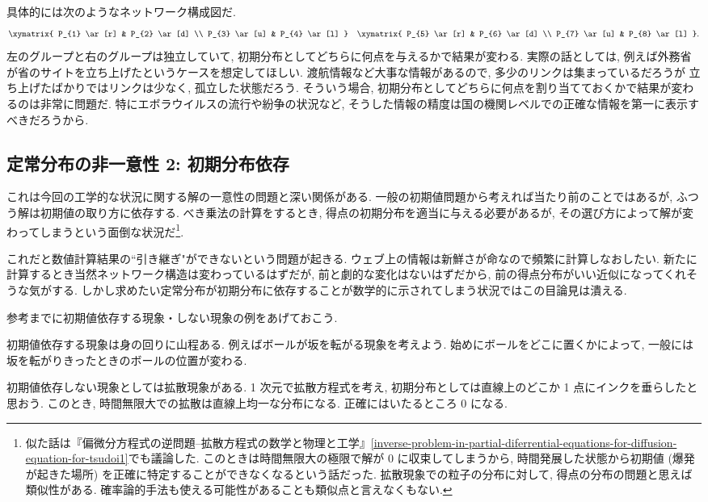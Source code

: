 \documentclass[openany, a4paper, oneside]{jsbook}
\begin{document}
具体的には次のようなネットワーク構成図だ.
\begin{align}
 \xymatrix{
  P_{1} \ar[r] & P_{2} \ar[d] \\
  P_{3} \ar[u] & P_{4} \ar[l]
 }
 \quad
 \xymatrix{
  P_{5} \ar[r] & P_{6} \ar[d] \\
  P_{7} \ar[u] & P_{8} \ar[l]
 }.
\end{align}
左のグループと右のグループは独立していて,
初期分布としてどちらに何点を与えるかで結果が変わる.
実際の話としては, 例えば外務省が省のサイトを立ち上げたというケースを想定してほしい.
渡航情報など大事な情報があるので, 多少のリンクは集まっているだろうが
立ち上げたばかりではリンクは少なく, 孤立した状態だろう.
そういう場合, 初期分布としてどちらに何点を割り当てておくかで結果が変わるのは非常に問題だ.
特にエボラウイルスの流行や紛争の状況など,
そうした情報の精度は国の機関レベルでの正確な情報を第一に表示すべきだろうから.
\subsection{定常分布の非一意性 2: 初期分布依存}

これは今回の工学的な状況に関する解の一意性の問題と深い関係がある.
一般の初期値問題から考えれば当たり前のことではあるが,
ふつう解は初期値の取り方に依存する.
べき乗法の計算をするとき, 得点の初期分布を適当に与える必要があるが,
その選び方によって解が変わってしまうという面倒な状況だ\footnote{似た話は『偏微分方程式の逆問題--拡散方程式の数学と物理と工学』\ref{inverse-problem-in-partial-diferrential-equations-for-diffusion-equation-for-tsudoi1}でも議論した.
このときは時間無限大の極限で解が 0 に収束してしまうから,
時間発展した状態から初期値 (爆発が起きた場所) を正確に特定することができなくなるという話だった.
拡散現象での粒子の分布に対して, 得点の分布の問題と思えば類似性がある.
確率論的手法も使える可能性があることも類似点と言えなくもない.}.

これだと数値計算結果の``引き継ぎ"ができないという問題が起きる.
ウェブ上の情報は新鮮さが命なので頻繁に計算しなおしたい.
新たに計算するとき当然ネットワーク構造は変わっているはずだが,
前と劇的な変化はないはずだから, 前の得点分布がいい近似になってくれそうな気がする.
しかし求めたい定常分布が初期分布に依存することが数学的に示されてしまう状況ではこの目論見は潰える.

\begin{rem}
参考までに初期値依存する現象・しない現象の例をあげておこう.

初期値依存する現象は身の回りに山程ある.
例えばボールが坂を転がる現象を考えよう.
始めにボールをどこに置くかによって,
一般には坂を転がりきったときのボールの位置が変わる.

初期値依存しない現象としては拡散現象がある.
1 次元で拡散方程式を考え, 初期分布としては直線上のどこか 1 点にインクを垂らしたと思おう.
このとき, 時間無限大での拡散は直線上均一な分布になる.
正確にはいたるところ 0 になる.
\end{rem}
\end{document}
